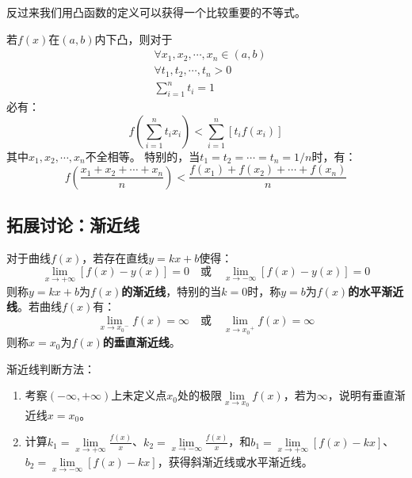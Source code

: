 \begin{tcolorbox}
反过来我们用凸函数的定义可以获得一个比较重要的不等式。
\end{tcolorbox}

\begin{definition}
若$f\left( x \right) $在$\left( a,b \right) $内下凸，则对于
\begin{align*}
&\forall x_1,x_2,\cdots ,x_n\in \left( a,b \right) \\
&\forall t_1,t_2,\cdots ,t_n>0 \\
&\sum_{i=1}^n{t_i}=1
\end{align*}
必有：
\[
f\left( \sum_{i=1}^n{t_ix_i} \right) <\sum_{i=1}^n{\left[ t_if\left( x_i \right) \right]}
\]
其中$x_1,x_2,\cdots ,x_n$不全相等。
特别的，当$t_1=t_2=\cdots =t_n=1/n$时，有：
\[
f\left( \frac{x_1+x_2+\cdots +x_n}{n} \right) <\frac{f\left( x_1 \right) +f\left( x_2 \right) +\cdots +f\left( x_n \right)}{n}
\]
\end{definition}

\subsection{拓展讨论：渐近线}

\begin{definition}[函数的渐近线]
对于曲线$f\left( x \right) $，若存在直线$y=kx+b$使得：
\[
\underset{x\rightarrow +\infty}{\lim}\left[ f\left( x \right) -y\left( x \right) \right] =0 \quad \text{或} \quad \underset{x\rightarrow -\infty}{\lim}\left[ f\left( x \right) -y\left( x \right) \right] =0
\]
则称$y=kx+b$为{\bf $f\left( x \right) $的渐近线}，特别的当$k=0$时，称$y=b$为{\bf $f\left( x \right) $的水平渐近线}。若曲线$f\left( x \right) $有：
\[
\underset{x\rightarrow {x_0}^-}{\lim}f\left( x \right) =\infty  \quad \text{或} \quad \underset{x\rightarrow {x_0}^+}{\lim}f\left( x \right) =\infty
\]
则称$x=x_0$为{\bf $f\left( x \right) $的垂直渐近线}。
\end{definition}

渐近线判断方法：
\begin{enumerate}
    \item 考察$\left( -\infty ,+\infty \right) $上未定义点$x_0$处的极限$\underset{x\rightarrow x_0}{\lim}f\left( x \right) $，若为$\infty $，说明有垂直渐近线$x=x_0$。
    \item 计算$k_1=\underset{x\rightarrow +\infty}{\lim}\frac{f\left( x \right)}{x}$、$k_2=\underset{x\rightarrow -\infty}{\lim}\frac{f\left( x \right)}{x}$，和$b_1=\underset{x\rightarrow +\infty}{\lim}\left[ f\left( x \right) -kx \right] $、$b_2=\underset{x\rightarrow -\infty}{\lim}\left[ f\left( x \right) -kx \right] $，获得斜渐近线或水平渐近线。
\end{enumerate}

